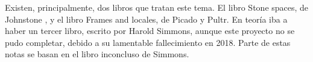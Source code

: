 Existen, principalmente, dos libros que tratan este tema.
El libro Stone spaces, de Johnstone \cite{johnstone1986stone},
y el libro Frames and locales, de Picado y Pultr.
En teoría iba a haber un tercer libro, escrito por Harold Simmons,
aunque este proyecto no se pudo completar, debido a su
lamentable fallecimiento en 2018.
Parte de estas notas se basan en el libro inconcluso de Simmons.

%
%

